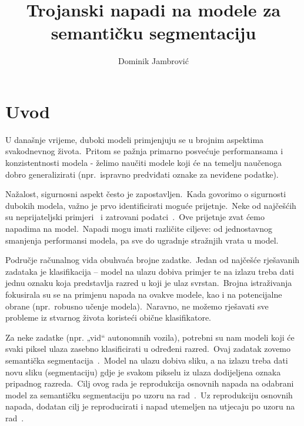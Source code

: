 \documentclass[times, utf8, seminar, numeric]{fer}
\begin{document}
\title{Trojanski napadi na modele za semantičku segmentaciju}

\author{Dominik Jambrović}


\maketitle

\tableofcontents

\chapter{Uvod}

U današnje vrijeme, duboki modeli primjenjuju se u brojnim aspektima svakodnevnog života.\ 
Pritom se pažnja primarno posvećuje performansama i konzistentnosti modela - želimo naučiti modele koji će na temelju naučenoga dobro generalizirati (npr.\ ispravno predviđati oznake za neviđene podatke).\
  
Nažalost, sigurnosni aspekt često je zapostavljen.\ Kada govorimo o sigurnosti dubokih modela, važno je prvo identificirati moguće prijetnje.\ 
Neke od najčešćih su neprijateljski primjeri~\cite{goodfellow2014explaining} i zatrovani podatci~\cite{chen2017targeted}.\
Ove prijetnje zvat ćemo napadima na model.\ Napadi mogu imati različite ciljeve: od jednostavnog smanjenja performansi modela, pa sve do ugradnje stražnjih vrata u model.\
  
Područje računalnog vida obuhvaća brojne zadatke.\ Jedan od najčešće rješavanih zadataka je klasifikacija – model na ulazu dobiva primjer te na izlazu treba dati jednu oznaku koja predstavlja razred u koji je ulaz svrstan.\ 
Brojna istraživanja fokusirala su se na primjenu napada na ovakve modele, kao i na potencijalne obrane (npr.\ robusno učenje modela).\ Naravno, ne možemo rješavati sve probleme iz stvarnog života koristeći obične klasifikatore.\ 
  
Za neke zadatke (npr. „vid“ autonomnih vozila), potrebni su nam modeli koji će svaki piksel ulaza zasebno klasificirati u određeni razred.\ Ovaj zadatak zovemo semantička segmentacija~\cite{garcia2017review}.\
Model na ulazu dobiva sliku, a na izlazu treba dati novu sliku (segmentaciju) gdje je svakom pikselu iz ulaza dodijeljena oznaka pripadnog razreda.\ 
Cilj ovog rada je reprodukcija osnovnih napada na odabrani model za semantičku segmentaciju po uzoru na rad~\cite{li2021hidden}.\
Uz reprodukciju osnovnih napada, dodatan cilj je reproducirati i napad utemeljen na utjecaju po uzoru na rad~\cite{lan2023influencer}.\
\end{document}
